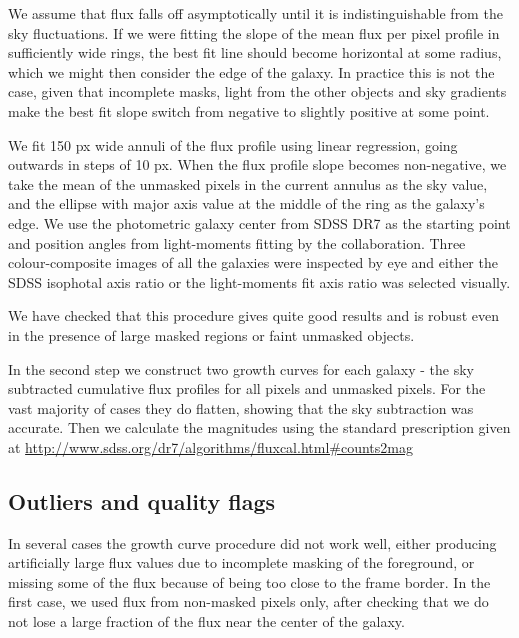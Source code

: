 \documentclass[apj, onecolumn]{emulateapj}
\begin{document}
We assume that flux falls off asymptotically until it is indistinguishable from the sky fluctuations.
If we were fitting the slope of the mean flux per pixel profile in sufficiently wide rings, the best fit line should become horizontal at some radius, which we might then consider the edge of the galaxy. In practice this is not the case, given that incomplete masks, light from the other objects and sky gradients make the best fit slope switch from negative to slightly positive at some point. 

We fit 150 px wide annuli of the flux profile using linear regression, going outwards in steps of 10 px. When the flux profile slope becomes non-negative, we take the mean of the unmasked pixels in the current annulus as the sky value, and the ellipse with major axis value at the middle of the ring as the galaxy's edge. We use the photometric galaxy center from SDSS DR7 as the starting point and position angles from light-moments fitting by the collaboration. Three colour-composite images of all the galaxies were inspected by eye and either the SDSS isophotal axis ratio or the light-moments fit axis ratio was selected visually. 

We have checked that this procedure gives quite good results and is robust even in the presence of large masked regions or faint unmasked objects. %

In the second step we construct two growth curves for each galaxy - the sky subtracted cumulative flux profiles for all pixels and unmasked pixels. For the vast majority of cases they do flatten, showing that the sky subtraction was accurate. Then we calculate the magnitudes using the standard prescription given at \url{http://www.sdss.org/dr7/algorithms/fluxcal.html#counts2mag}


\subsection{Outliers and quality flags}
In several cases the growth curve procedure did not work well, either producing artificially large flux values due to incomplete masking of the foreground, or missing some of the flux because of being too close to the frame border. In the first case, we used flux from non-masked pixels only, after checking that we do not lose a large fraction of the flux near the center of the galaxy. 
\end{document}

